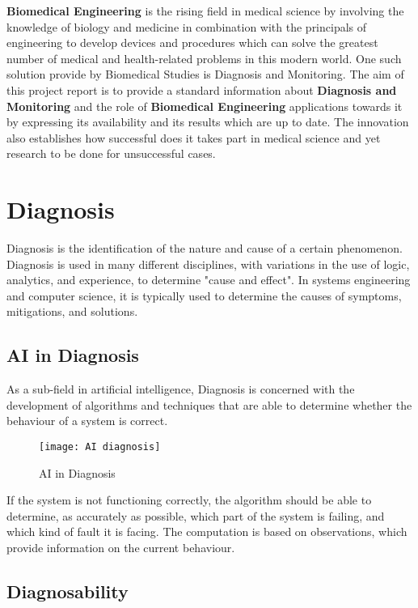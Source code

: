 \documentclass[12pt]{article}
\begin{document}
\begin{center}
{\bfseries Biomedical Engineering} is the rising field in medical science by involving the knowledge of biology and medicine in combination with the principals of engineering to develop devices and procedures which can solve the greatest number of medical and health-related  problems in this modern world. One such solution provide by Biomedical Studies is Diagnosis and Monitoring. The aim of this project report is to  provide a standard information about {\bfseries Diagnosis and Monitoring} and the role of {\bfseries Biomedical Engineering} applications towards it by expressing its availability and its results which are up to date. The innovation also establishes how successful does it takes part in medical science and yet research to be done for unsuccessful cases.
\end{center}
\clearpage

\section{Diagnosis}

Diagnosis is the identification of the nature and cause of a certain phenomenon. Diagnosis is used in many different disciplines, with variations in the use of logic, analytics, and experience, to determine "cause and effect". In systems engineering and computer science, it is typically used to determine the causes of symptoms, mitigations, and solutions.

\subsection{AI in Diagnosis}

As a sub-field in artificial intelligence, Diagnosis is concerned with the development of algorithms and techniques that are able to determine whether the behaviour of a system is correct.

\begin{figure}[ht]
\centering
\texttt{[image: AI diagnosis]}
\caption{AI in Diagnosis}
\end{figure} 

If the system is not functioning correctly, the algorithm should be able to determine, as accurately as possible, which part of the system is failing, and which kind of fault it is facing. The computation is based on observations, which provide information on the current behaviour.

\subsection{Diagnosability}
\end{document}
